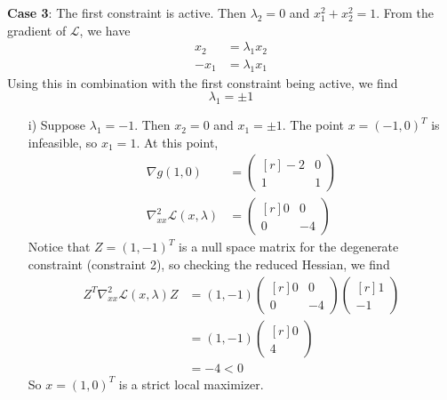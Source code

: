 \documentclass{article}
\begin{document}
\begin{itemize}
\begin{itemize}
        \textbf{Case 3}: The first constraint is active. 
        \newline
        Then $\lambda_2 = 0$ and $x_1^2 + x_2^2 = 1$. 
        \newline
        From the gradient of $\mathscr{L}$, we have 
        \begin{align*}
            x_2 &= \lambda_1 x_2\\
            -x_1 &= \lambda_1 x_1
        \end{align*}
        Using this in combination with the first constraint being active, we find 
        \[\lambda_1 = \pm 1\]
        \begin{itemize}
            \item[i)] Suppose $\lambda_1 = -1$. Then $x_2 = 0$ and $x_1 = \pm 1$. The point $x = (-1,0)^T$ is infeasible, so $x_1 = 1$. 
            \newline
            At this point,
            \begin{align*}
                \nabla g(1,0) &= \begin{pmatrix*}[r]
                    -2 & 0\\
                    1 & 1
                \end{pmatrix*}\\
                \nabla_{xx}^2\mathscr{L}(x,\lambda) &= \begin{pmatrix*}[r]
                    0 & 0\\
                    0 & -4
                \end{pmatrix*}
            \end{align*}      
            Notice that $Z = (1,-1)^T$ is a null space matrix for the degenerate constraint (constraint 2), so checking the reduced Hessian, we find
            \begin{align*}
                Z^T\nabla_{xx}^2\mathscr{L}(x,\lambda)Z &= (1,-1)\begin{pmatrix*}[r]
                    0 & 0\\
                    0 & -4
                \end{pmatrix*}\begin{pmatrix*}[r]
                    1\\
                    -1
                \end{pmatrix*}\\
                &= (1,-1)\begin{pmatrix*}[r]
                    0\\
                    4
                \end{pmatrix*}\\
                &= -4 < 0
            \end{align*} 
            So $x = (1,0)^T$ is a strict local maximizer.


\end{itemize}
\end{itemize}
\end{itemize}
\end{document}
